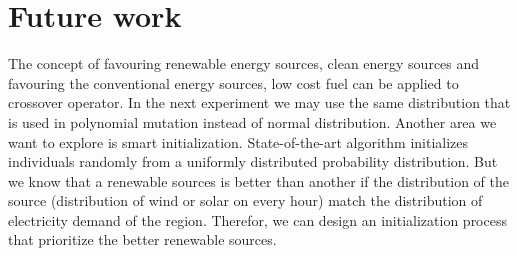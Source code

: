 \documentclass{article}
\begin{document}
\section{Future work}
The concept of favouring renewable energy sources, clean energy sources and favouring the conventional energy sources, low cost fuel can be applied to crossover operator.
In the next experiment we may use the same distribution that is used in polynomial mutation instead of normal distribution.
Another area we want to explore is smart initialization.
State-of-the-art algorithm initializes individuals randomly from a uniformly distributed probability distribution. 
But we know that a renewable sources is better than another if the distribution of the source (distribution of wind or solar on every hour) match the distribution of electricity demand of the region.  
Therefor, we can design an initialization process that prioritize the better renewable sources.


 

  
\end{document}
